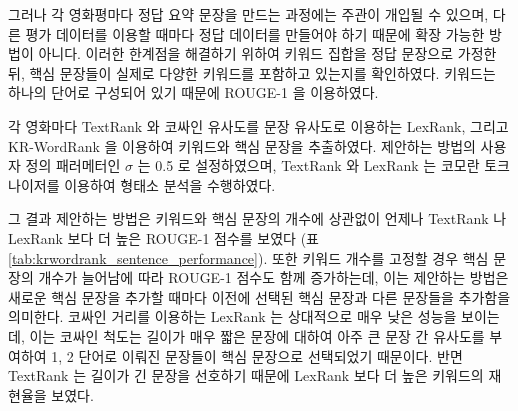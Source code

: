 \documentclass[oneside, ko,phd]{snuthesis_utf8_kor}
\begin{document}
그러나 각 영화평마다 정답 요약 문장을 만드는 과정에는 주관이 개입될 수 있으며, 다른 평가 데이터를 이용할 때마다 정답 데이터를 만들어야 하기 때문에 확장 가능한 방법이 아니다.
이러한 한계점을 해결하기 위하여 키워드 집합을 정답 문장으로 가정한 뒤, 핵심 문장들이 실제로 다양한 키워드를 포함하고 있는지를 확인하였다.
키워드는 하나의 단어로 구성되어 있기 때문에 ROUGE-1 을 이용하였다.

각 영화마다 TextRank 와 코싸인 유사도를 문장 유사도로 이용하는 LexRank, 그리고 KR-WordRank 을 이용하여 키워드와 핵심 문장을 추출하였다.
제안하는 방법의 사용자 정의 패러메터인 $\sigma$ 는 0.5 로 설정하였으며, TextRank 와 LexRank 는 코모란 토크나이저를 이용하여 형태소 분석을 수행하였다.

그 결과 제안하는 방법은 키워드와 핵심 문장의 개수에 상관없이 언제나 TextRank 나 LexRank 보다 더 높은 ROUGE-1 점수를 보였다 (표 \ref{tab:krwordrank_sentence_performance}).
또한 키워드 개수를 고정할 경우 핵심 문장의 개수가 늘어남에 따라 ROUGE-1 점수도 함께 증가하는데, 이는 제안하는 방법은 새로운 핵심 문장을 추가할 때마다 이전에 선택된 핵심 문장과 다른 문장들을 추가함을 의미한다.
코싸인 거리를 이용하는 LexRank 는 상대적으로 매우 낮은 성능을 보이는데, 이는 코싸인 척도는 길이가 매우 짧은 문장에 대하여 아주 큰 문장 간 유사도를 부여하여 1, 2 단어로 이뤄진 문장들이 핵심 문장으로 선택되었기 때문이다.
반면 TextRank 는 길이가 긴 문장을 선호하기 때문에 LexRank 보다 더 높은 키워드의 재현율을 보였다.
\end{document}
